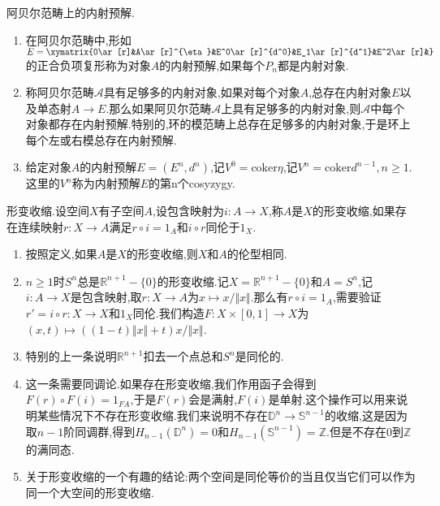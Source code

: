 阿贝尔范畴上的内射预解.
\begin{enumerate}
	\item 在阿贝尔范畴中,形如$E=\xymatrix{0\ar[r]&A\ar[r]^{\eta}&E^0\ar[r]^{d^0}&E_1\ar[r]^{d^1}&E^2\ar[r]&}$的正合负项复形称为对象$A$的内射预解,如果每个$P_n$都是内射对象.
	\item 称阿贝尔范畴$\mathscr{A}$具有足够多的内射对象,如果对每个对象$A$,总存在内射对象$E$以及单态射$A\to E$.那么如果阿贝尔范畴$\mathscr{A}$上具有足够多的内射对象,则$\mathscr{A}$中每个对象都存在内射预解.特别的,环的模范畴上总存在足够多的内射对象,于是环上每个左或右模总存在内射预解.
	\item 给定对象$A$的内射预解$E=(E^n,d^n)$,记$V^0=\mathrm{coker}\eta$,记$V^n=\mathrm{coker}d^{n-1},n\ge1$.这里的$V^n$称为内射预解$E$的第n个cosyzygy.
\end{enumerate}



形变收缩.设空间$X$有子空间$A$,设包含映射为$i:A\to X$,称$A$是$X$的形变收缩,如果存在连续映射$r:X\to A$满足$r\circ i=1_A$和$i\circ r$同伦于$1_X$.
\begin{enumerate}
	\item 按照定义,如果$A$是$X$的形变收缩,则$X$和$A$的伦型相同.
	\item $n\ge1$时$S^n$总是$\mathbb{R}^{n+1}-\{0\}$的形变收缩.记$X=\mathbb{R}^{n+1}-\{0\}$和$A=S^n$,记$i:A\to X$是包含映射,取$r:X\to A$为$x\mapsto x/\Vert x\Vert$.那么有$r\circ i=1_A$,需要验证$r'=i\circ r:X\to X$和$1_X$同伦.我们构造$F:X\times[0,1]\to X$为$(x,t)\mapsto\left((1-t)\Vert x\Vert+t\right)x/\Vert x\Vert$.
	\item 特别的上一条说明$\mathbb{R}^{n+1}$扣去一个点总和$S^n$是同伦的.
	\item 这一条需要同调论.如果存在形变收缩,我们作用函子会得到$F(r)\circ F(i)=1_{FA}$,于是$F(r)$会是满射,$F(i)$是单射.这个操作可以用来说明某些情况下不存在形变收缩.我们来说明不存在$\mathbb{D}^n\to\mathbb{S}^{n-1}$的收缩,这是因为取$n-1$阶同调群,得到$H_{n-1}(\mathbb{D}^n)=0$和$H_{n-1}(\mathbb{S}^{n-1})=\mathbb{Z}$.但是不存在$0$到$\mathbb{Z}$的满同态.
	\item 关于形变收缩的一个有趣的结论:两个空间是同伦等价的当且仅当它们可以作为同一个大空间的形变收缩.
\end{enumerate}

